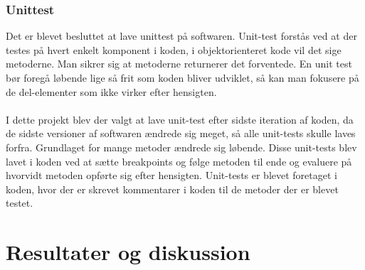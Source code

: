 \subsubsection{Unittest}
Det er blevet besluttet at lave unittest på softwaren. Unit-test forstås ved at der testes på hvert enkelt komponent i koden, i objektorienteret kode vil det sige metoderne. Man sikrer sig at metoderne returnerer det forventede. En unit test bør foregå løbende lige så frit som koden bliver udviklet, så kan man fokusere på de del-elementer som ikke virker efter hensigten. \\
\\
I dette projekt blev der valgt at lave unit-test efter sidste iteration af koden, da de sidste versioner af softwaren ændrede sig meget, så alle unit-tests skulle laves forfra. Grundlaget for mange metoder ændrede sig løbende. Disse unit-tests blev lavet i koden ved at sætte breakpoints og følge metoden til ende og evaluere på hvorvidt metoden opførte sig efter hensigten. Unit-tests er blevet foretaget i koden, hvor der er skrevet kommentarer i koden til de metoder der er blevet testet.
\section{Resultater og diskussion}
